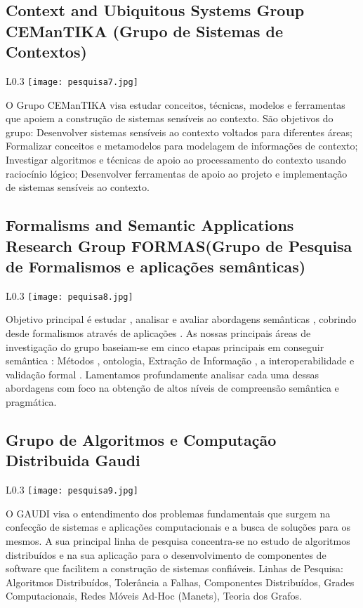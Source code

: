      \subsection{Context and Ubiquitous Systems Group CEManTIKA
     (Grupo de Sistemas de Contextos)}
      \begin{wrapfigure}{L}{0.3\textwidth}
            \centering
            \texttt{[image: pesquisa7.jpg]}
        \end{wrapfigure} 
     O Grupo CEManTIKA visa estudar conceitos, técnicas, modelos e ferramentas que apoiem a construção de sistemas sensíveis ao contexto. São objetivos do grupo: 
      Desenvolver sistemas sensíveis ao contexto voltados para diferentes áreas; 
      Formalizar conceitos e metamodelos para modelagem de informações de contexto; 
      Investigar algoritmos e técnicas de apoio ao processamento do contexto usando raciocínio lógico; 
      Desenvolver ferramentas de apoio ao projeto e implementação de sistemas sensíveis ao contexto. 
    
     \subsection{Formalisms and Semantic Applications Research Group FORMAS(Grupo de Pesquisa de Formalismos e \newline aplicações semânticas)}
      \begin{wrapfigure}{L}{0.3\textwidth}
            \centering
            \texttt{[image: pequisa8.jpg]}
        \end{wrapfigure} 
      Objetivo principal é estudar , analisar e avaliar abordagens semânticas , cobrindo desde formalismos através de aplicações . As nossas principais áreas de investigação do grupo baseiam-se em cinco etapas principais em conseguir semântica : Métodos , ontologia, Extração de Informação , a interoperabilidade e validação formal . Lamentamos profundamente analisar cada uma dessas abordagens com foco na obtenção de altos níveis de compreensão semântica e pragmática.
    
     \subsection{Grupo de Algoritmos e Computação Distribuida Gaudi}
      \begin{wrapfigure}{L}{0.3\textwidth}
            \centering
            \texttt{[image: pesquisa9.jpg]}
        \end{wrapfigure} 
     O GAUDI visa o entendimento dos problemas fundamentais que surgem na confecção de sistemas e aplicações computacionais e a busca de soluções para os mesmos. A sua principal linha de pesquisa concentra-se no estudo de algoritmos distribuídos e na sua aplicação para o desenvolvimento de componentes de software que facilitem a construção de sistemas confiáveis. 
      Linhas de Pesquisa: Algoritmos Distribuídos, Tolerância a Falhas, Componentes Distribuídos, Grades Computacionais, Redes Móveis Ad-Hoc (Manets), Teoria dos Grafos.
     
